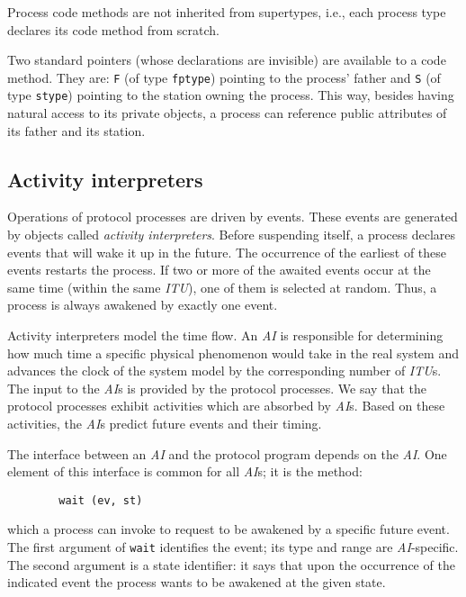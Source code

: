 Process code methods are not inherited from supertypes, i.e.,
each process type declares its code method from scratch.

Two standard pointers (whose declarations are invisible) are available to
a code method.
They are: {\tt F} (of type {\tt fptype}) pointing to the process' father
and {\tt S} (of type {\tt stype}) pointing to the station owning the
process.
This way, besides having natural access to its private objects, a process can
reference public attributes of its father and its station.

\subsection{Activity interpreters}

Operations of protocol processes are driven by events.
These events are generated by objects called {\em activity interpreters}.
Before suspending itself, a process declares events that will wake it
up in the future.
The occurrence of the earliest of these events restarts the
process.
If two or more of the awaited events occur at the same time
(within the same {\em ITU\/}),
one of them is selected at random.
Thus, a process is always awakened by exactly one event.

Activity interpreters model the time flow.
An {\em AI\/} is responsible for determining how much time a specific
physical phenomenon would take in the real system and advances the
clock of the system model by the corresponding number of {\em ITU\/}s.
The input to the {\em AI\/}s is provided by the protocol processes.
We say that the protocol processes exhibit activities which are absorbed
by {\em AI\/}s.
Based on these activities, the {\em AI\/}s predict future events and their
timing.

The interface between an {\em AI\/} and the protocol program depends on the
{\em AI}.
One element of this interface
is common for all {\em AI\/}s; it is the method:
{\small
\begin{verbatim}
        wait (ev, st)
\end{verbatim} }
\noindent
which a process can invoke to request to be awakened by a specific future event.
The first argument of {\tt wait} identifies the event; its type and range are
{\em AI\/}-specific.
The second argument is a state identifier: it says that upon the occurrence of
the indicated event the process wants to be awakened at the given state.

